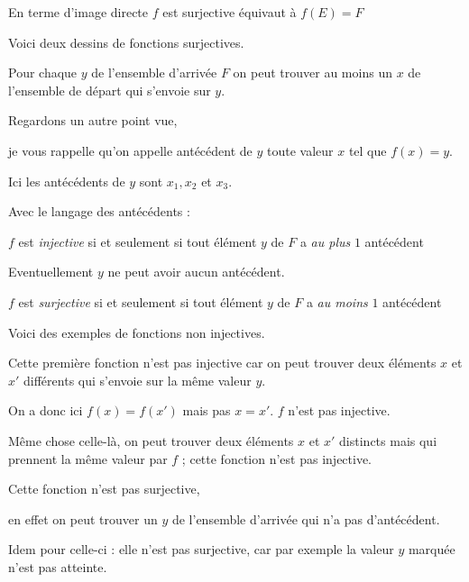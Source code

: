 En terme d'image directe $f$ est surjective équivaut à $f(E)=F$

\change

Voici deux dessins de fonctions surjectives.

\change

Pour chaque $y$ de l'ensemble d'arrivée $F$ on peut trouver au moins un
$x$ de l'ensemble de départ qui s'envoie sur $y$.



\diapo


Regardons un autre point vue,

je vous rappelle qu'on appelle antécédent de $y$ toute valeur $x$ tel que $f(x)=y$.

Ici les antécédents de $y$ sont $x_1, x_2$ et $x_3$.

\change

Avec le langage des antécédents : 

$f$ est \emph{injective} si et seulement si tout élément $y$ de $F$ a \emph{au plus} $1$ antécédent

Eventuellement $y$ ne peut avoir aucun antécédent.

\change

$f$ est \emph{surjective} si et seulement si tout élément $y$ de $F$ a \emph{au moins} $1$ antécédent


\diapo


Voici des exemples de fonctions non injectives.

Cette première fonction n'est pas injective car on peut trouver deux éléments 
$x$ et $x'$ différents qui s'envoie sur la même valeur $y$.

On a donc ici $f(x)=f(x')$ mais pas $x=x'$. $f$ n'est pas injective.

\change

Même chose celle-là, on peut trouver deux éléments $x$ et $x'$ distincts mais qui  
prennent la même valeur par $f$ ; cette fonction n'est pas injective.

\diapo

Cette fonction n'est pas surjective,

en effet on peut trouver un $y$ de l'ensemble d'arrivée 
qui n'a pas d'antécédent.

\change

Idem pour celle-ci : elle n'est pas surjective, car par exemple la valeur $y$
marquée n'est pas atteinte.



